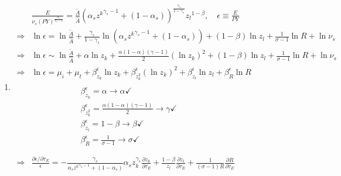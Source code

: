 \documentclass[12pt]{article} %
\begin{document}
\begin{enumerate}
    \item 
    \begin{equation*}
        \begin{split}
            & \frac{E}{\nu_{s}(PY)^{\frac{\sigma_s}{\sigma_s - 1}}}  = \frac{\tilde{A}}{\hat{A}}\left(
                \alpha_s {{z^k}}^{\gamma_s - 1} + (1-\alpha_s)
            \right) ^ {\frac{\gamma_s}{1-\gamma_s}} {{z_l}}^{1 - \beta} , \quad \epsilon \equiv  \frac{E}{PY}\\
            \Rightarrow & \ln \epsilon =  \ln \frac{\tilde{A}}{\hat{A}} + \frac{\gamma_s}{1-\gamma_s} \ln \left(
                \alpha_s {{z^k}}^{\gamma_s - 1} + (1-\alpha_s)
            \right) + (1-\beta) \ln {{z_l}} + \frac{1}{\sigma -1} \ln R + \ln \nu_{s} \\
            \Rightarrow &\ln \epsilon \sim \ln \frac{\tilde{A}}{\hat{A}} + \alpha \ln z_k + \frac{\alpha(1-\alpha)(\gamma-1)}{2} (\ln z_k)^2 + (1-\beta) \ln {{z_l}} + \frac{1}{\sigma -1} \ln R + \ln \nu_{s} \\
            \Rightarrow& \ln \epsilon = \mu_i + \mu_t + \beta_{z_k}^{\epsilon} \ln z_k + \beta_{z_k^2}^{\epsilon} (\ln z_k)^2 + \beta_{z_l}^{\epsilon} \ln z_l + \beta_{R}^{\epsilon} \ln R  \\\\
            &     \qquad\qquad\qquad        \beta_{z_k}^{\epsilon} = \alpha \rightarrow \alpha \checkmark\\
            &     \qquad\qquad\qquad        \beta_{z_k^2}^{\epsilon} = \frac{\alpha(1-\alpha)(\gamma-1)}{2}\rightarrow \gamma \checkmark \\
            &     \qquad\qquad\qquad        \beta_{z_l}^{\epsilon} = 1-\beta \rightarrow \beta\checkmark\\
            &     \qquad\qquad\qquad        \beta_{R}^{\epsilon} = \frac{1}{\sigma -1} \rightarrow \sigma \checkmark
            \\\\\\
            \Rightarrow & \frac{\partial \epsilon/\partial \tau_E}{\epsilon} =  -\frac{\gamma_s}{\alpha_s {{z^k}}^{\gamma_s - 1} + (1-\alpha_s)} {\alpha_s z_k^{\gamma_s}} \frac{\partial z_k}{\partial \tau_E} + \frac{1-\beta}{z_l} \frac{\partial z_l}{\partial \tau_E} + \frac{1}{(\sigma -1)R} \frac{\partial R}{\partial \tau_E}
        \end{split}
    \end{equation*}
\end{enumerate}

\clearpage
\end{document}
